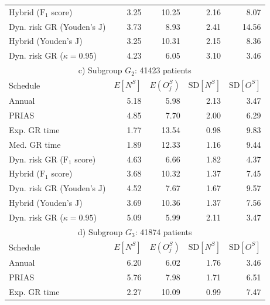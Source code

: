 \begin{table}[!htb]
\begin{tabular}{lrrrr}
Hybrid ($\mbox{F}_1$ score)       & 3.25            & 10.25               & 2.16          & 8.07              \\
Dyn. risk GR (Youden's $\mbox{J}$)      & 3.73            & 8.93                & 2.41          & 14.56            \\
Hybrid (Youden's $\mbox{J}$)   & 3.25            & 10.31                & 2.15          & 8.36              \\
Dyn. risk GR ($\kappa=0.95$) & 4.23 & 6.05 & 3.10 & 3.46\\
\hline      
\multicolumn{5}{c}{c) Subgroup $G_2$: 41423 patients}\\
\hline
Schedule        & $E[N^S]$ & $E(O^S_j)$ & ${\mbox{SD}[N^S]}$ & ${\mbox{SD}[O^S]}$ \\
\hline
Annual         & 5.18            & 5.98                & 2.13          & 3.47              \\
PRIAS          & 4.85            & 7.70                & 2.00          & 6.29        \\
Exp. GR time & 1.77            & 13.54               & 0.98          & 9.83              \\
Med. GR time & 1.89             & 12.33               & 1.16          & 9.44              \\
Dyn. risk GR ($\mbox{F}_1$ score)       & 4.63            & 6.66                & 1.82          & 4.37              \\
Hybrid ($\mbox{F}_1$ score)       & 3.68            & 10.32                & 1.37          & 7.45              \\
Dyn. risk GR (Youden's $\mbox{J}$)      & 4.52            & 7.67                & 1.67          & 9.57           \\
Hybrid (Youden's $\mbox{J}$)   & 3.69             & 10.36               & 1.37          & 7.56              \\
Dyn. risk GR ($\kappa=0.95$) & 5.09 & 5.99 & 2.11 & 3.47\\
\hline      
\multicolumn{5}{c}{d) Subgroup $G_3$: 41874 patients}\\
\hline
Schedule        & $E[N^S]$ & $E(O^S_j)$ & ${\mbox{SD}[N^S]}$ & ${\mbox{SD}[O^S]}$ \\
\hline
Annual         & 6.20             & 6.02                & 1.76          & 3.46              \\
PRIAS          & 5.76             & 7.98                & 1.71         & 6.51        \\
Exp. GR time & 2.27            & 10.09               & 0.99          & 7.47              \\

\end{tabular}
\end{table}

